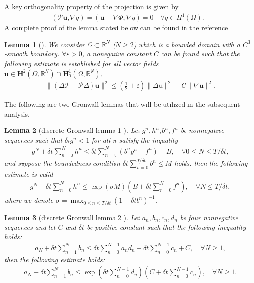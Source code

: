 \documentclass[10pt]{article}
\newtheorem{lemma}{Lemma}[section]
\begin{document}
	A key orthogonality property of the projection is given by
	\begin{align}
		(\mathcal{P}\bm{u},\nabla q)=(\bm{u}-\nabla \varPhi,\nabla q)=0    \quad\forall q\in \mathit{H}^1(\Omega).
	\end{align}
	A complete proof of the lemma stated below can be found in the reference \cite {J2007} .
	\begin{lemma}[\cite {J2007}]\label{Lem2.2}
		{\it We consider $\Omega \subset \mathbb{R}^N$ ($N \geq 2$) which is a bounded domain with a $C^3$-smooth boundary. $\forall \varepsilon > 0$,  a nonegative constant $C$ can be found such that the following estimate is established for all vector fields $\bm{u} \in \bm{H}^2(\Omega, \mathbb{R}^N) \cap \bm{H}_0^1(\Omega, \mathbb{R}^N)$,
			\begin{align}
				&\| (\Delta \mathcal{P}-\mathcal{P}\Delta) \bm{u}\|^2 \leq (\frac{1}{2}+\varepsilon) \|\Delta \bm{u}\|^2 +C\|\nabla \bm{u}\|^2.
		\end{align}  }
	\end{lemma}
	The following are two Gronwall lemmas that will be utilized in the subsequent analysis.
	\begin{lemma}[discrete Gronwall lemma 1 \cite{J2012}]\label{Lem2.3}
			{\it Let $g^n,h^n,b^n,f^n$ be nonnegative sequences  such that $\delta tg^n<1$ for all $n$  satisfy the inquality
			\begin{align}
				&g^N+\delta t\sum_{n=0}^N h^n\leq\delta t\sum_{n=0}^{N}(b^ng^n+f^n)+B,  
				\quad \forall0\leq N \leq T/\delta t,
			\end{align}
			and suppose the boundedness condition $ \delta t\sum_{n=0}^{T/\delta t}b^n \leq M$ holds. then the following estimate is valid
			\begin{align}
				&g^N+\delta t\sum_{n=0}^N h^n\leq \exp(\sigma M)(B+\delta t\sum_{n=0}^{N}f^n), \quad \forall N\leq T/\delta t,
			\end{align}  
			where we denote $\sigma=\max_{0\leqslant n\leqslant T/\delta t}(1-\delta t b^n)^{-1}$.}
	\end{lemma}
	\begin{lemma}[discrete Gronwall lemma 2 \cite{JS1990}]
		{\it Let $a_n,b_n,c_n,d_n$ be four nonnegative sequences and let  $C$ and $\delta t$ be positive constant such that the following inequality holds:
			\begin{align}
				&a_N+\delta t\sum_{n=1}^N b_n\leq\delta t \sum_{n=0}^{N-1}a_nd_n+\delta t\sum_{n=0}^{N-1} c_n+C, \quad\forall N\geq1,
			\end{align}
			then the following estimate holds:
			\begin{align}
				&a_N+\delta t\sum_{n=1}^N b_n\leq \exp(\delta t\sum_{n=0}^{N-1} d_n)(C+\delta t\sum_{n=0}^{N-1}c_n),  \quad\forall N\geq 1 .
		\end{align}  }
	\end{lemma}
\end{document}
